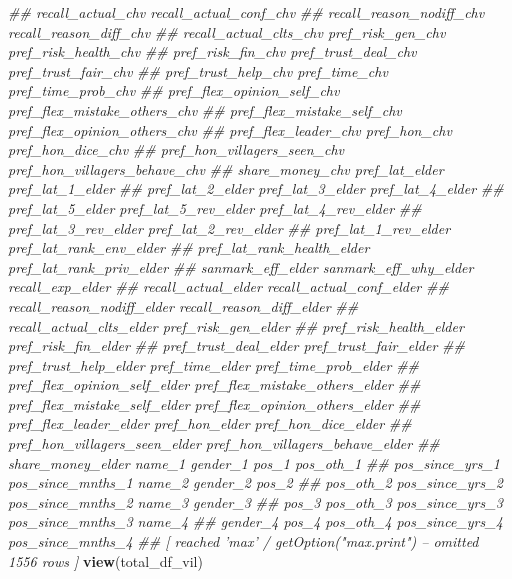 \documentclass[
]{article}
\newenvironment{Shaded}{\begin{snugshade}}{\end{snugshade}}
\newcommand{\CommentTok}[1]{\textcolor[rgb]{0.56,0.35,0.01}{\textit{#1}}}
\newcommand{\KeywordTok}[1]{\textcolor[rgb]{0.13,0.29,0.53}{\textbf{#1}}}
\newcommand{\NormalTok}[1]{#1}
\begin{document}
\begin{Shaded}
\begin{Highlighting}[]
\CommentTok{##      recall_actual_chv recall_actual_conf_chv}
\CommentTok{##      recall_reason_nodiff_chv recall_reason_diff_chv}
\CommentTok{##      recall_actual_clts_chv pref_risk_gen_chv pref_risk_health_chv}
\CommentTok{##      pref_risk_fin_chv pref_trust_deal_chv pref_trust_fair_chv}
\CommentTok{##      pref_trust_help_chv pref_time_chv pref_time_prob_chv}
\CommentTok{##      pref_flex_opinion_self_chv pref_flex_mistake_others_chv}
\CommentTok{##      pref_flex_mistake_self_chv pref_flex_opinion_others_chv}
\CommentTok{##      pref_flex_leader_chv pref_hon_chv pref_hon_dice_chv}
\CommentTok{##      pref_hon_villagers_seen_chv pref_hon_villagers_behave_chv}
\CommentTok{##      share_money_chv pref_lat_elder pref_lat_1_elder}
\CommentTok{##      pref_lat_2_elder pref_lat_3_elder pref_lat_4_elder}
\CommentTok{##      pref_lat_5_elder pref_lat_5_rev_elder pref_lat_4_rev_elder}
\CommentTok{##      pref_lat_3_rev_elder pref_lat_2_rev_elder}
\CommentTok{##      pref_lat_1_rev_elder pref_lat_rank_env_elder}
\CommentTok{##      pref_lat_rank_health_elder pref_lat_rank_priv_elder}
\CommentTok{##      sanmark_eff_elder sanmark_eff_why_elder recall_exp_elder}
\CommentTok{##      recall_actual_elder recall_actual_conf_elder}
\CommentTok{##      recall_reason_nodiff_elder recall_reason_diff_elder}
\CommentTok{##      recall_actual_clts_elder pref_risk_gen_elder}
\CommentTok{##      pref_risk_health_elder pref_risk_fin_elder}
\CommentTok{##      pref_trust_deal_elder pref_trust_fair_elder}
\CommentTok{##      pref_trust_help_elder pref_time_elder pref_time_prob_elder}
\CommentTok{##      pref_flex_opinion_self_elder pref_flex_mistake_others_elder}
\CommentTok{##      pref_flex_mistake_self_elder pref_flex_opinion_others_elder}
\CommentTok{##      pref_flex_leader_elder pref_hon_elder pref_hon_dice_elder}
\CommentTok{##      pref_hon_villagers_seen_elder pref_hon_villagers_behave_elder}
\CommentTok{##      share_money_elder name_1 gender_1 pos_1 pos_oth_1}
\CommentTok{##      pos_since_yrs_1 pos_since_mnths_1 name_2 gender_2 pos_2}
\CommentTok{##      pos_oth_2 pos_since_yrs_2 pos_since_mnths_2 name_3 gender_3}
\CommentTok{##      pos_3 pos_oth_3 pos_since_yrs_3 pos_since_mnths_3 name_4}
\CommentTok{##      gender_4 pos_4 pos_oth_4 pos_since_yrs_4 pos_since_mnths_4}
\CommentTok{##  [ reached 'max' / getOption("max.print") -- omitted 1556 rows ]}
\KeywordTok{view}\NormalTok{(total_df_vil)}



\end{Highlighting}
\end{Shaded}
\end{document}
